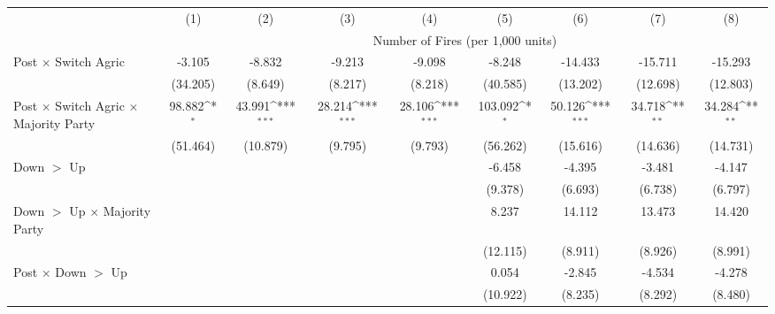 {
\def\sym#1{\ifmmode^{#1}\else\(^{#1}\)\fi}
\begin{tabular}{l*{8}{c}}
\hline
 & (1) & (2) & (3) & (4) & (5) & (6) & (7) & (8) \\
            & \multicolumn{8}{c}{Number of Fires (per 1,000 units)} \\
           \hline

Post $\times$ Switch Agric&      -3.105         &      -8.832         &      -9.213         &      -9.098         &      -8.248         &     -14.433         &     -15.711         &     -15.293         \\
            &    (34.205)         &     (8.649)         &     (8.217)         &     (8.218)         &    (40.585)         &    (13.202)         &    (12.698)         &    (12.803)         \\
Post $\times$ Switch Agric $\times$ Majority Party&      98.882\sym{*}  &      43.991\sym{***}&      28.214\sym{***}&      28.106\sym{***}&     103.092\sym{*}  &      50.126\sym{***}&      34.718\sym{**} &      34.284\sym{**} \\
            &    (51.464)         &    (10.879)         &     (9.795)         &     (9.793)         &    (56.262)         &    (15.616)         &    (14.636)         &    (14.731)         \\
Down $>$ Up &                     &                     &                     &                     &      -6.458         &      -4.395         &      -3.481         &      -4.147         \\
            &                     &                     &                     &                     &     (9.378)         &     (6.693)         &     (6.738)         &     (6.797)         \\
Down $>$ Up $\times$ Majority Party&                     &                     &                     &                     &       8.237         &      14.112         &      13.473         &      14.420         \\
            &                     &                     &                     &                     &    (12.115)         &     (8.911)         &     (8.926)         &     (8.991)         \\
Post $\times$ Down $>$ Up&                     &                     &                     &                     &       0.054         &      -2.845         &      -4.534         &      -4.278         \\
            &                     &                     &                     &                     &    (10.922)         &     (8.235)         &     (8.292)         &     (8.480)         \\

\end{tabular}}
